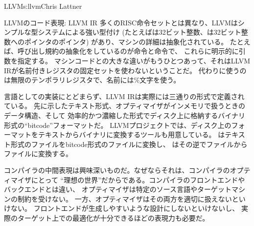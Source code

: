 \begin{aosachapter}{LLVM}{s:llvm}{Chris Lattner}
\begin{aosasect1}{LLVMのコード表現: LLVM IR}
多くのRISC命令セットとは異なり、LLVMはシンプルな型システムによる強い型付け
(たとえばは32ビット整数、は32ビット整数へのポインタのポインタ)
があり、マシンの詳細は抽象化されている。
たとえば、呼び出し規約の抽象化をしているのが命令と命令で、
これらに明示的に引数を指定する。
マシンコードとの大きな違いがもうひとつあって、それはLLVM IRが名前付きレジスタの固定セットを使わないということだ。
代わりに使うのは無限のテンポラリレジスタで、名前には\%文字を使う。

言語としての実装にとどまらず、LLVM IRは実際には三通りの形式で定義されている。
先に示したテキスト形式、オプティマイザがインメモリで扱うときのデータ構造、そして
効率的かつ濃縮した形式でディスク上に格納するバイナリ形式の``bitcode''フォーマットだ。
LLVMプロジェクトでは、ディスク上のフォーマットをテキストからバイナリに変換するツールも用意している。
はテキスト形式のファイルをbitcode形式のファイルに変換し、
はその逆でファイルからファイルに変換する。

コンパイラの中間表現は興味深いものだ。なぜならそれは、コンパイラのオプティマイザにとって
``理想の世界''だからである。コンパイラのフロントエンドやバックエンドとは違い、
オプティマイザは特定のソース言語やターゲットマシンの制約を受けない。
一方、オプティマイザはその両方を適切に扱えないといけない。
フロントエンドが生成しやすいような設計にしないといけないし、
実際のターゲット上での最適化が十分できるほどの表現力も必要だ。


\end{aosasect1}
\end{aosachapter}
